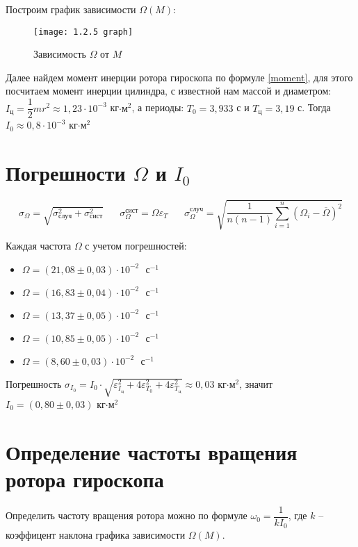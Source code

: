 \documentclass[a4paper,12pt]{article}
\begin{document}
	Построим график зависимости $\Omega(M)$:
	\begin{figure}[h!]
		\texttt{[image: 1.2.5 graph]}
		\caption{Зависимость $ \Omega $ от $ M $}
		\label{graph}
	\end{figure}

	Далее найдем момент инерции ротора гироскопа по формуле \eqref{moment}, для этого посчитаем момент инерции цилиндра, с известной нам массой и диаметром: $I_\text{ц} = \dfrac{1}{2}mr^2 \approx 1,23\cdot 10^{-3}$ кг$\cdot \text{м}^2$, а периоды: $T_0 = 3,933$ с и $T_\text{ц} = 3,19$ с. Тогда $I_0 \approx 0,8\cdot 10^{-3}$ кг$\cdot \text{м}^2$
	
	\section{Погрешности $\Omega$ и $I_0$}
	
	\begin{equation}
		\sigma_\Omega = \sqrt{ \sigma_\text{случ}^2 + \sigma_\text{сист}^2} \;\;\;\;\;\; \sigma_\Omega^\text{сист} = \Omega \varepsilon_T \;\;\;\;\;\; \sigma_\Omega^\text{случ}=  \sqrt{\frac{1}{n(n-1)} \sum_{i=1}^{n}(\Omega_i - \overline{\Omega})^2}
	\end{equation}
	
	Каждая частота $\Omega$ с учетом погрешностей:
	\begin{itemize}
		\item $\Omega = (21,08 \pm 0,03)\cdot10^{-2}\text{ }\text{с}^{-1}$ 
		\item $\Omega = (16,83 \pm 0,04)\cdot10^{-2}\text{ }\text{с}^{-1}$
		\item $\Omega = (13,37 \pm 0,05)\cdot10^{-2}\text{ }\text{с}^{-1}$
		\item $\Omega = (10,85 \pm 0,05)\cdot10^{-2}\text{ }\text{с}^{-1}$
		\item $\Omega = (8,60 \pm 0,03)\cdot10^{-2}\text{ }\text{с}^{-1}$
	\end{itemize}

	Погрешность $\sigma_{I_0} = I_0\cdot\sqrt{\varepsilon_{I_\text{ц}}^2+ 4\varepsilon_{T_0}^2+ 4\varepsilon_{T_\text{ц}}^2 } \approx 0,03$ кг$\cdot \text{м}^2$, значит $I_0 = (0,80\pm 0,03)$ кг$\cdot \text{м}^2$
	
	\section{Определение частоты вращения ротора гироскопа}
	
	Определить частоту вращения ротора можно по формуле $\omega_0 = \dfrac{1}{kI_0}$, где $k$ -- коэффицент наклона графика зависимости $\Omega(M)$.
	
\end{document}
